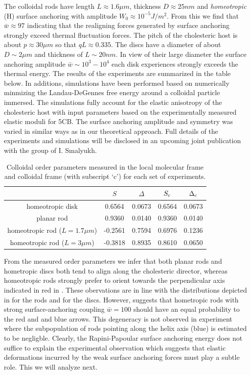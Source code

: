 The colloidal rods have length $L\approx 1.6 \mu m$, thickness $D \approx 25 nm$ and {\em homeotropic} (H) surface anchoring with amplitude $W_{0} \approx 10^{-5} J/m^{2}$. From this we find that $\bar{w} \approx 97$ indicating that the realigning forces generated by surface anchoring strongly exceed thermal fluctuation forces. The pitch of the cholesteric host is about $p \approx 30 \mu m $ so that $qL  \approx 0.335 $. The discs have a diameter of about $D \sim 2 \mu m $ and thickness of $L \sim 20 nm$. In view of their large diameter the surface anchoring amplitude $\bar{w} \sim 10^{3}-10^{4}$ each disk experiences strongly exceeds the thermal energy.  The results of the experiments are summarized in the table below. In additions, simulations have been performed based on numerically minmizing the Landau-DeGennes free energy around a colloidal particle immersed. The simulations fully account for the elastic anisotropy of the cholesteric host with input parameters based on the experimentally measured elastic moduli for 5CB. The surface anchoring amplitude and symmetry was varied in similar ways as in our theoretical approach.   Full details of the experiments and simulations will be disclosed in an upcoming joint publication with the group of I. Smalyukh. 



\begin{table}[h!]
\centering
    \begin{tabular}{|c||c c c c|} 
    \hline
    & $S$ & $\Delta$ & $S_{\rm{c}}$ & $\Delta_{\rm{c}}$ \\  
    \hline\hline
    homeotropic  disk &  0.6564 & 0.0673 & 0.6564 & 0.0673  \\ 
    \hline
    planar rod & 0.9360 & 0.0140 & 0.9360 & 0.0140   \\
    \hline
    homeotropic rod ($L = 1.7 \mu m$) &  -0.2561 & 0.7594 &  0.6976 & 0.1236  \\
    \hline
    homeotropic rod ($L = 3 \mu m$) & -0.3818 & 0.8935 & 0.8610 & 0.0650  \\
    \hline
    \end{tabular}
    \caption{Colloidal order parameters measured in the local molecular frame  and colloidal frame (with subscript `c') for each set of experiments. }
    \label{table_OPs}
\end{table}
From the measured order parameters  we infer that both  planar rods and hometropic discs both tend to align along the cholesteric director, whereas homeotropic rods strongly prefer to orient towards the perpendicular axis indicated in red in . These obervations are in line with the distributions depicted in  for the rods and  for the discs. However,  suggests that hometropic rods with strong surface-anchoring coupling  $\bar{w} = 100 $ should  have an equal probability to the red and and blue arrows. This degeneracy is not observed in experiment where the subpopulation of rods pointing along the helix axis (blue) is estimated to be negligble. Clearly, the Rapini-Papoular surface anchoring energy does not suffice to explain the experimental observation which suggests that  elastic deformations incurred by the weak surface anchoring forces must play a subtle role.   This we will analyze next.


